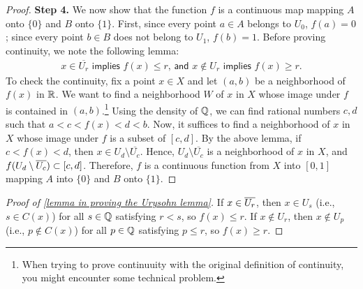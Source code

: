 \begin{proof}
    \textbf{Step 4.}
    We now show that the function $f$ is a continuous map mapping $A$ onto $\{0\}$ and $B$ onto $\{1\}$.
    First, since every point $a\in A$ belongs to $U_0$, $f(a)=0$; since every point $b\in B$ does not belong to $U_1$, $f(b)=1$.
    Before proving continuity, we note the following lemma:
    \begin{align}\label{lemma in proving the Urysohn lemma}
        \textsf{$x\in\overline{U_r}$ implies $f(x)\leq r$, and $x\notin U_r$ implies $f(x)\geq r$.}
    \end{align}
    To check the continuity, fix a point $x\in X$ and let $(a, b)$ be a neighborhood of $f(x)$ in ${\mathbb{R}}$.
    We want to find a neighborhood $W$ of $x$ in $X$ whose image under $f$ is contained in $(a, b)$.\footnote{When trying to prove continuuity with the original definition of continuity, you might encounter some technical problem.}
    Using the density of ${\mathbb{Q}}$, we can find rational numbers $c, d$ such that $a<c<f(x)<d<b$.
    Now, it suffices to find a neighborhood of $x$ in $X$ whose image under $f$ is a subset of $[c, d]$.
    By the above lemma, if $c<f(x)<d$, then $x\in U_d\setminus\overline{U_c}$.
    Hence, $U_d\setminus\overline{U_c}$ is a neighborhood of $x$ in $X$, and $f(U_d\setminus\overline{U_c})\subset[c, d]$.
    Therefore, $f$ is a continuous function from $X$ into $[0, 1]$ mapping $A$ into $\{0\}$ and $B$ onto $\{1\}$.
\end{proof}
\begin{proof}[Proof of \cref{lemma in proving the Urysohn lemma}]
    If $x\in \overline{U_r}$, then $x\in U_s$ (i.e., $s\in C(x)$) for all $s\in{\mathbb{Q}}$ satisfying $r<s$, so $f(x)\leq r$.
    If $x\notin U_r$, then $x\notin U_p$ (i.e., $p\notin C(x)$) for all $p\in{\mathbb{Q}}$ satisfying $p\leq r$, so $f(x)\geq r$.
\end{proof}

